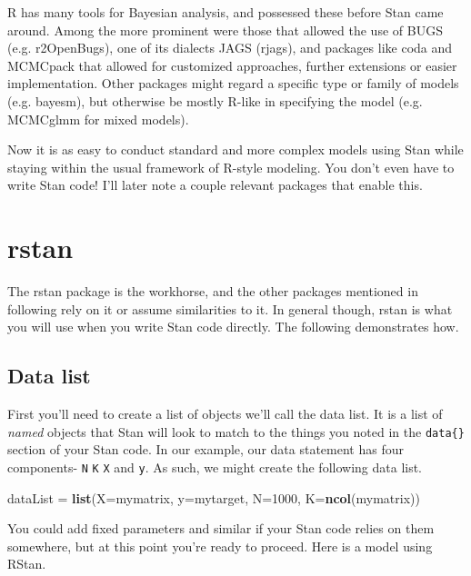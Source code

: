 \documentclass[]{book}
\newenvironment{Shaded}{\begin{snugshade}}{\end{snugshade}}
\newcommand{\KeywordTok}[1]{\textcolor[rgb]{0.13,0.29,0.53}{\textbf{{#1}}}}
\newcommand{\DataTypeTok}[1]{\textcolor[rgb]{0.13,0.29,0.53}{{#1}}}
\newcommand{\DecValTok}[1]{\textcolor[rgb]{0.00,0.00,0.81}{{#1}}}
\newcommand{\StringTok}[1]{\textcolor[rgb]{0.31,0.60,0.02}{{#1}}}
\newcommand{\NormalTok}[1]{{#1}}
\begin{document}
R has many tools for Bayesian analysis, and possessed these before Stan
came around. Among the more prominent were those that allowed the use of
BUGS (e.g. {r2OpenBugs}), one of its dialects JAGS ({rjags}), and
packages like {coda} and {MCMCpack} that allowed for customized
approaches, further extensions or easier implementation. Other packages
might regard a specific type or family of models (e.g. {bayesm}), but
otherwise be mostly R-like in specifying the model (e.g. {MCMCglmm} for
mixed models).

Now it is as easy to conduct standard and more complex models using Stan
while staying within the usual framework of R-style modeling. You don't
even have to write Stan code! I'll later note a couple relevant packages
that enable this.

\section{rstan}\label{rstan}

The {rstan} package is the workhorse, and the other packages mentioned
in following rely on it or assume similarities to it. In general though,
{rstan} is what you will use when you write Stan code directly. The
following demonstrates how.

\subsection{Data list}\label{data-list}

First you'll need to create a list of objects we'll call the {data
list}. It is a list of \emph{named} objects that Stan will look to match
to the things you noted in the \texttt{data\{\}} section of your Stan
code. In our example, our data statement has four components- \texttt{N}
\texttt{K} \texttt{X} and \texttt{y}. As such, we might create the
following data list.

\begin{Shaded}
\begin{Highlighting}[]
\NormalTok{dataList =}\StringTok{  }\KeywordTok{list}\NormalTok{(}\DataTypeTok{X=}\NormalTok{mymatrix, }\DataTypeTok{y=}\NormalTok{mytarget, }\DataTypeTok{N=}\DecValTok{1000}\NormalTok{, }\DataTypeTok{K=}\KeywordTok{ncol}\NormalTok{(mymatrix))}
\end{Highlighting}
\end{Shaded}

You could add fixed parameters and similar if your Stan code relies on
them somewhere, but at this point you're ready to proceed. Here is a
model using RStan.
\end{document}
